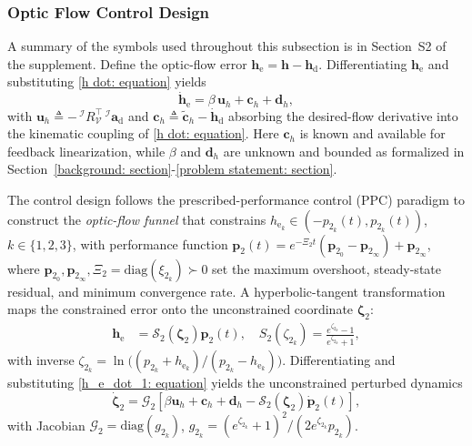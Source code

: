 \subsubsection{Optic Flow Control Design} \label{optic flow control: section}
A summary of the symbols used throughout this subsection is in Section~S2 of the supplement. Define the optic-flow error $\boldsymbol{h}_\text{e}=\boldsymbol{h}-\boldsymbol{h}_\text{d}$. Differentiating $\boldsymbol{h}_\text{e}$ and substituting \eqref{h dot: equation} yields
\begin{equation} \label{h_e_dot_1: equation}
    \dot{\boldsymbol{h}}_\text{e} = \beta\,\boldsymbol{u}_h + \boldsymbol{c}_h + \boldsymbol{d}_h,
\end{equation}
with $\boldsymbol{u}_h \triangleq -\,^\mathcal{I}R_\mathcal{V}^\top\,^\mathcal{I}\boldsymbol{a}_\text{d}$ and $\boldsymbol{c}_h \triangleq \tilde{\boldsymbol{c}}_h - \dot{\boldsymbol{h}}_\text{d}$ absorbing the desired-flow derivative into the kinematic coupling of \eqref{h dot: equation}. Here $\boldsymbol{c}_h$ is known and available for feedback linearization, while $\beta$ and $\boldsymbol{d}_h$ are unknown and bounded as formalized in Section~\ref{background: section}-\ref{problem statement: section}.

The control design follows the prescribed-performance control (PPC) paradigm \cite{lin2022} to construct the \emph{optic-flow funnel} that constrains $h_{\text{e}_k}\in(-p_{2_k}(t),p_{2_k}(t))$, $k\in\{1,2,3\}$, with performance function $\boldsymbol{p}_2(t) = e^{-\Xi_2 t}(\boldsymbol{p}_{2_0}-\boldsymbol{p}_{2_\infty})+\boldsymbol{p}_{2_\infty}$, where $\boldsymbol{p}_{2_0},\boldsymbol{p}_{2_\infty},\Xi_2=\text{diag}(\xi_{2_k})\succ 0$ set the maximum overshoot, steady-state residual, and minimum convergence rate. A hyperbolic-tangent transformation maps the constrained error onto the unconstrained coordinate $\boldsymbol{\zeta}_2$:
\begin{align}
    \label{optical flow error transformation: equation}
    \boldsymbol{h}_\text{e} &= \mathcal{S}_2(\boldsymbol{\zeta}_2)\boldsymbol{p}_2(t),\quad S_2(\zeta_{2_k}) = \frac{e^{\zeta_{2_k}}-1}{e^{\zeta_{2_k}}+1},
\end{align}
with inverse $\zeta_{2_k}=\ln\!\big((p_{2_k}+h_{\text{e}_k})/(p_{2_k}-h_{\text{e}_k})\big)$. Differentiating and substituting \eqref{h_e_dot_1: equation} yields the unconstrained perturbed dynamics
\begin{equation} \label{unconstrained system: equation}
    \dot{\boldsymbol{\zeta}}_2 = \mathcal{G}_2\!\left[\beta\boldsymbol{u}_h + \boldsymbol{c}_h + \boldsymbol{d}_h - \mathcal{S}_2(\boldsymbol{\zeta}_2)\dot{\boldsymbol{p}}_2(t)\right],
\end{equation}
with Jacobian $\mathcal{G}_2=\text{diag}(g_{2_k})$, $g_{2_k}=(e^{\zeta_{2_k}}+1)^2/(2e^{\zeta_{2_k}}p_{2_k})$.

